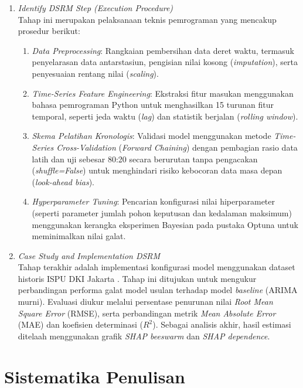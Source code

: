 \begin{enumerate}
\item {\textit{Identify DSRM Step (Execution Procedure)}}\\
Tahap ini merupakan pelaksanaan teknis pemrograman yang mencakup prosedur berikut:
   \begin{enumerate}
       \item \textit{Data Preprocessing}: Rangkaian pembersihan data deret waktu, termasuk penyelarasan data antarstasiun, pengisian nilai kosong (\textit{imputation}), serta penyesuaian rentang nilai (\textit{scaling}).
       \item \textit{Time-Series Feature Engineering}: Ekstraksi fitur masukan menggunakan bahasa pemrograman Python untuk menghasilkan 15 turunan fitur temporal, seperti jeda waktu (\textit{lag}) dan statistik berjalan (\textit{rolling window}).
       \item \textit{Skema Pelatihan Kronologis}: Validasi model menggunakan metode \textit{Time-Series Cross-Validation} (\textit{Forward Chaining}) dengan pembagian rasio data latih dan uji sebesar 80:20 secara berurutan tanpa pengacakan (\textit{shuffle=False}) untuk menghindari risiko kebocoran data masa depan (\textit{look-ahead bias}).
       \item \textit{Hyperparameter Tuning}: Pencarian konfigurasi nilai hiperparameter (seperti parameter jumlah pohon keputusan dan kedalaman maksimum) menggunakan kerangka eksperimen Bayesian pada pustaka Optuna untuk meminimalkan nilai galat.
   \end{enumerate}

\item {\textit{Case Study and Implementation DSRM}}\\
Tahap terakhir adalah implementasi konfigurasi model menggunakan dataset historis ISPU DKI Jakarta \autocite{pohan2025jakarta}. Tahap ini ditujukan untuk mengukur perbandingan performa galat model usulan terhadap model \textit{baseline} (ARIMA murni). Evaluasi diukur melalui persentase penurunan nilai \textit{Root Mean Square Error} (RMSE), serta perbandingan metrik \textit{Mean Absolute Error} (MAE) dan koefisien determinasi ($R^2$). Sebagai analisis akhir, hasil estimasi ditelaah menggunakan grafik \textit{SHAP beeswarm} dan \textit{SHAP dependence}.

\end{enumerate}

\section{Sistematika Penulisan}

